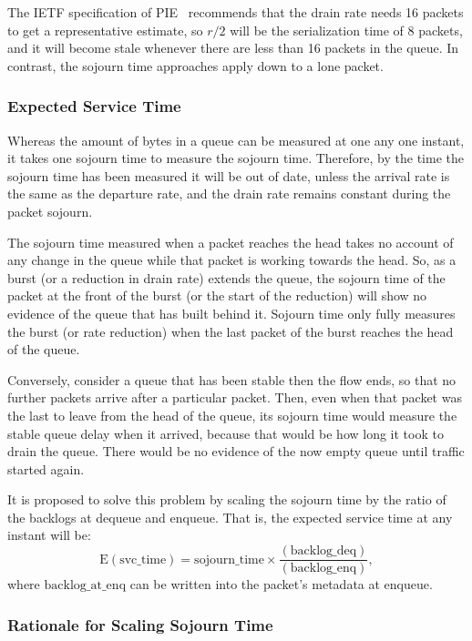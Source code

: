 The IETF specification of PIE~\cite{Pan17:PIE} recommends that the drain rate needs 16 packets to get a representative estimate, so \(r/2\) will be the serialization time of 8 packets, and it will become stale whenever there are less than 16 packets in the queue. In contrast, the sojourn time approaches apply down to a lone packet.

\subsubsection{Expected Service Time}\label{sec:inst_svc_time}

Whereas the amount of bytes in a queue can be measured at one any one instant, it takes one sojourn time to measure the sojourn time. Therefore, by the time the sojourn time has been measured it will be out of date, unless the arrival rate is the same as the departure rate, and the drain rate remains constant during the packet sojourn. 

The sojourn time measured when a packet reaches the head takes no account of any change in the queue while that packet is working towards the head. So, as a burst (or a reduction in drain rate) extends the queue, the sojourn time of the packet at the front of the burst (or the start of the reduction) will show no evidence of the queue that has built behind it. Sojourn time only fully measures the burst (or rate reduction) when the last packet of the burst reaches the head of the queue. 

Conversely, consider a queue that has been stable then the flow ends, so that no further packets arrive after a particular packet. Then, even when that packet was the last to leave from the head of the queue, its sojourn time would measure the stable queue delay when it arrived, because that would be how long it took to drain the queue. There would be no evidence of the now empty queue until traffic started again.

It is proposed to solve this problem by scaling the sojourn time by the ratio of the backlogs at dequeue and enqueue. That is, the expected service time at any instant will be:
\[\mathrm{E(svc\_time)} = \mathrm{sojourn\_time} \times \frac{\mathrm{(backlog\_deq)}}{\mathrm{(backlog\_enq)}},\]
where \(\mathrm{backlog\_at\_enq}\) can be written into the packet's metadata at enqueue.

\subsubsection{Rationale for Scaling Sojourn Time}\label{sec:inst_svc_time_justify}

